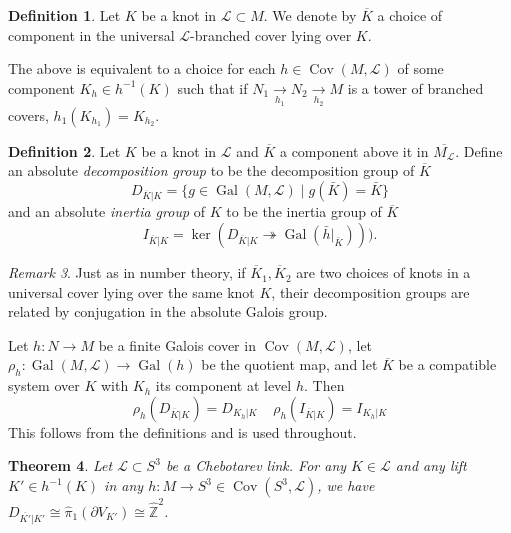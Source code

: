 \documentclass{amsart}
\theoremstyle{plain}
\newtheorem{theorem}{Theorem}[section]
\theoremstyle{definition}
\newtheorem{Def}[theorem]{Definition}
\theoremstyle{plain}
\theoremstyle{plain}
\theoremstyle{plain}
\theoremstyle{remark}
\newtheorem{remark}[theorem]{Remark}
\theoremstyle{remark}
\theoremstyle{plain}
\theoremstyle{definition}
\theoremstyle{plain}
\DeclareMathOperator{\Gal}{\mathrm{Gal}}
\DeclareMathOperator{\Cov}{\mathrm{Cov}}
\theoremstyle{plain}
\theoremstyle{plain}
\numberwithin{equation}{section}
\begin{document}
\begin{Def}
Let $K$ be a knot in $\mathcal{L} \subset M$. We denote by $\overline{K}$ a choice of component in the universal $\mathcal{L}$-branched cover lying over $K$.
\end{Def}

The above is equivalent to a choice for each $h \in \Cov(M, \mathcal{L})$ of some component $K_h \in h^{-1}(K)$ such that if $N_1 \underset{h_1}{\to} N_2 \underset{h_2}{\to} M$ is a tower of branched covers, $h_1(K_{h_1}) = K_{h_2}$. 


\begin{Def}\label{def:decomposition}
Let $K$ be a knot in $\mathcal{L}$ and $\overline{K}$ a component above it in $\overline{M_\mathcal{L}}$. Define an absolute \emph{decomposition group} to be the decomposition group of $\overline{K}$
\[    D_{\overline{K}|K}=\{g \in \Gal(M,\mathcal{L}) \mid g(\bar{K}) = \bar{K}\}\]
and an absolute \emph{inertia group} of $K$ to be the inertia group of $\overline{K}$ 
\[
    I_{\overline{K}|K}= \ker(D_{\overline{K}|K} \twoheadrightarrow \Gal(\bar{h}|_{\bar{K}}))).
\]
\end{Def}

\begin{remark}
Just as in number theory, if $\overline{K}_1, \overline{K}_2$ are two choices of knots in a universal cover lying over the same knot $K$, their decomposition groups are related by conjugation in the absolute Galois group. 
\end{remark}

Let $h: N \to M$ be a finite Galois cover in $\Cov(M, \mathcal L)$, let $\rho_h: \Gal(M, \mathcal L) \to \Gal(h)$ be the quotient map, and let $\overline K$ be a compatible system over $K$ with $K_h$ its component at level $h$. Then
\begin{equation}
    \rho_h(D_{\overline K|K}) = D_{K_h|K} \ \ \ \ \ \rho_h(I_{\overline K|K}) = I_{K_h|K}
\end{equation}
This follows from the definitions and is used throughout.

\begin{theorem}\label{thm:profinitetorus}
Let $\mathcal{L} \subset S^3$ be a Chebotarev link. For any $K \in \mathcal{L}$ and any lift $K' \in h^{-1}(K)$ in any $h: M \to S^3 \in \Cov(S^3, \mathcal{L})$, we have $ D_{\overline{K'}|K'} \cong\widehat{\pi}_1(\partial V_{K'})\cong \widehat{\mathbb{Z}}^2$.
\end{theorem}
\end{document}

